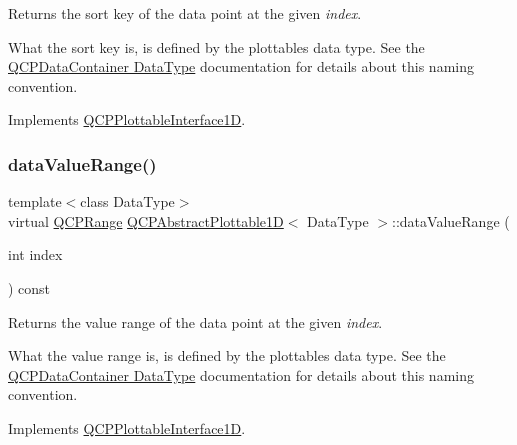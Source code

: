Returns the sort key of the data point at the given {\itshape index}.

What the sort key is, is defined by the plottable\textquotesingle{}s data type. See the \hyperlink{class_q_c_p_data_container_qcpdatacontainer-datatype}{Q\+C\+P\+Data\+Container Data\+Type} documentation for details about this naming convention. 

Implements \hyperlink{class_q_c_p_plottable_interface1_d_afdc92f9f01e7e35f2e96b2ea9dc14ae7}{Q\+C\+P\+Plottable\+Interface1D}.

\mbox{\label{class_q_c_p_abstract_plottable1_d_a3070f8b8ce4729ea60837aac603aa0f9}} 
\subsubsection{\texorpdfstring{data\+Value\+Range()}{dataValueRange()}\hspace{0.1cm}{\footnotesize\ttfamily [1/2]}}
{\footnotesize\ttfamily template$<$class Data\+Type$>$ \\
virtual \hyperlink{class_q_c_p_range}{Q\+C\+P\+Range} \hyperlink{class_q_c_p_abstract_plottable1_d}{Q\+C\+P\+Abstract\+Plottable1D}$<$ Data\+Type $>$\+::data\+Value\+Range (\begin{DoxyParamCaption}\item[{int}]{index }\end{DoxyParamCaption}) const\hspace{0.3cm}{\ttfamily [virtual]}}

Returns the value range of the data point at the given {\itshape index}.

What the value range is, is defined by the plottable\textquotesingle{}s data type. See the \hyperlink{class_q_c_p_data_container_qcpdatacontainer-datatype}{Q\+C\+P\+Data\+Container Data\+Type} documentation for details about this naming convention. 

Implements \hyperlink{class_q_c_p_plottable_interface1_d_a9ca7fcf14d885a200879768679b19be9}{Q\+C\+P\+Plottable\+Interface1D}.

\mbox{\label{class_q_c_p_abstract_plottable1_d_ac6201b01aee550ef0a240183781d1f9a}} 
